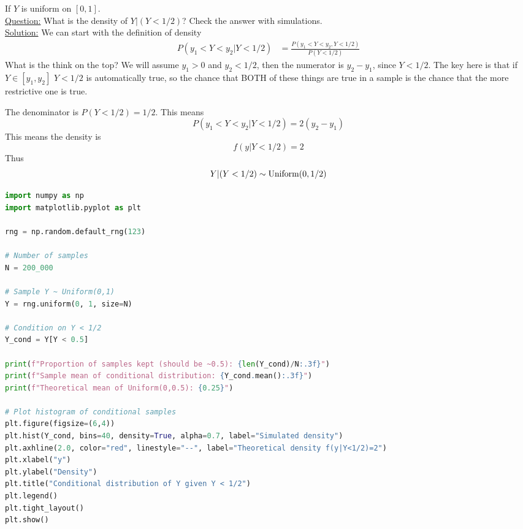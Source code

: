 \begin{example}
If $Y$ is uniform on $[0,1]$. \\


\noindent
\underline{Question:}  What is the density of $Y|(Y<1/2)$? Check the answer with simulations.\\

 \noindent
\underline{Solution:} We can start with the definition of density
\begin{align*}
P(y_1<Y<y_2|Y<1/2) &= \frac{P(y_1<Y<y_2,Y<1/2)}{P(Y<1/2)}
\end{align*}
What is the think on the top? We will assume $y_1>0$ and $y_2<1/2$, then the numerator is $y_2-y_1$, since $Y<1/2$. The key here is that if $Y \in [y_1,y_2]$ $Y<1/2$ is automatically true, so the chance that BOTH of these things are true in a sample is the chance that the more restrictive one is true.

The denominator is $P(Y<1/2) = 1/2$. This means
\begin{equation*}
P(y_1<Y<y_2|Y<1/2) = 2(y_2-y_1)
\end{equation*}
This means the density is
\begin{equation*}
f(y|Y<1/2) = 2
\end{equation*}
Thus
\begin{equation*}
Y|(Y<1/2) \sim {\rm Uniform}(0,1/2)
\end{equation*}


\begin{lstlisting}[language=Python]
import numpy as np
import matplotlib.pyplot as plt

rng = np.random.default_rng(123)

# Number of samples
N = 200_000

# Sample Y ~ Uniform(0,1)
Y = rng.uniform(0, 1, size=N)

# Condition on Y < 1/2
Y_cond = Y[Y < 0.5]

print(f"Proportion of samples kept (should be ~0.5): {len(Y_cond)/N:.3f}")
print(f"Sample mean of conditional distribution: {Y_cond.mean():.3f}")
print(f"Theoretical mean of Uniform(0,0.5): {0.25}")

# Plot histogram of conditional samples
plt.figure(figsize=(6,4))
plt.hist(Y_cond, bins=40, density=True, alpha=0.7, label="Simulated density")
plt.axhline(2.0, color="red", linestyle="--", label="Theoretical density f(y|Y<1/2)=2")
plt.xlabel("y")
plt.ylabel("Density")
plt.title("Conditional distribution of Y given Y < 1/2")
plt.legend()
plt.tight_layout()
plt.show()
\end{lstlisting}

\end{example}


